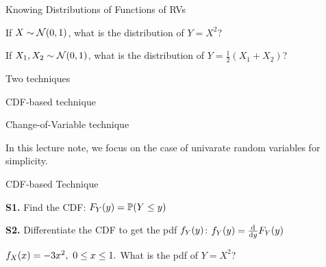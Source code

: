 \documentclass[handout,fleqn,aspectratio=169]{beamer}
\begin{document}
\begin{frame}{Knowing Distributions of Functions of RVs}

\plitemsep 0.1in

\bci 

\item If $X \sim {\cal N}(0,1)$, what is the distribution of $Y = X^2$?

\item If $X_1, X_2 \sim {\cal N}(0,1)$, what is the distribution of $Y = \frac{1}{2}(X_1 + X_2)$?

\item Two techniques
\bci

\item CDF-based technique

\item Change-of-Variable technique
\eci

\item In this lecture note, we focus on the case of univarate random variables for simplicity. 
\eci
\end{frame}

\begin{frame}{CDF-based Technique}

\plitemsep 0.1in

\bci 

\item[\bf S1.] Find the CDF: $F_Y(y) = \mathbb{P}( Y \le y )$

\item[\bf S2.] Differentiate the CDF to get the pdf $f_Y(y)$: $f_Y(y) = \frac{\text{d} }{\text{d} y}F_Y(y) $

\item \exam $f_X(x) = - 3x^2, \ 0 \le x \le 1.$ What is the pdf of $Y = X^2$?
\eci
\end{frame}
\end{document}
